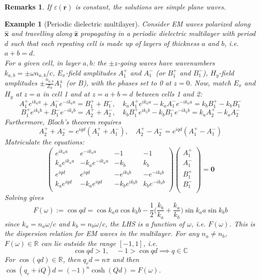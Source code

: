 \documentclass[a4paper]{article}
\newtheorem{remarks}{Remarks}[section]
\newtheorem{eg}{Example}[section]
\theoremstyle{new}
\begin{document}
\begin{remarks}
If $\varepsilon(\mathbf{r})$ is constant, the solutions are simple plane waves.
\end{remarks}
\begin{eg}[Periodic dielectric multilayer]
Consider EM waves polarized along $\mathbf{\hat{x}}$ and travelling along $\mathbf{\hat{z}}$ propagating in a periodic dielectric multilayer with period $d$ such that each repeating cell is made up of layers of thickness $a$ and $b$, i.e. $a+b=d$.\\[5pt]
For a given cell, in layer $a,b$: the $\pm z$-going waves have wavenumbers $k_{a,b}=\pm\omega n_{a,b}/c$, $E_x$-field amplitudes $A_1^+$ and $A_1^-$ (or $B_1^+$ and $B_1^-$), $H_y$-field amplitudes $\pm\frac{n_{a,b}}{Z_0}A_1^\pm$ (or $B$), with the phases set to 0 at $z=0$. Now, match $E_x$ and $H_y$ at $z=a$ in cell 1 and at $z=a+b=d$ between cells 1 and 2:
$$A_1^+e^{ik_aa}+A_1^-e^{-ik_aa}=B_1^++B_1^-,\quad k_aA_1^+e^{ik_aa}-k_aA_1^-e^{-ik_aa}=k_bB_1^+-k_bB_1^-$$
$$B_1^+e^{ik_bb}+B_1^-e^{-ik_bb}=A_2^++A_2^-,\quad k_bB_1^+e^{ik_bb}-k_bB_1^-e^{-ik_bb}=k_aA_2^+-k_aA_2^-$$
Furthermore, Bloch's theorem requires 
$$A_2^++A_2^-=e^{iqd}(A_1^++A_1^-),\quad A_2^+-A_2^-=e^{iqd}(A_1^+-A_1^-)$$
Matriculate the equations:
$$\begin{pmatrix}e^{ik_aa}&e^{-ik_aa}&-1&-1\\k_ae^{ik_aa}&-k_ae^{-ik_aa}&-k_b&k_b\\e^{iqd}&e^{iqd}&-e^{ik_bb}&-e^{-ik_bb}\\k_ae^{iqd}&-k_ae^{iqd}&-k_be^{ik_bb}&k_be^{-ik_bb}\\\end{pmatrix}\begin{pmatrix}A_1^+\\A_1^-\\B_1^+\\B_1^-\\\end{pmatrix}=\boldsymbol{0}$$
Solving gives
$$F(\omega):=\cos qd=\cos k_aa\cos k_bb-\frac{1}{2}\bigg(\frac{k_b}{k_a}+\frac{k_a}{k_b}\bigg)\sin k_aa\sin k_bb$$
since $k_a=n_a\omega/c$ and $k_b=n_b\omega/c$, the LHS is a function of $\omega$, i.e. $F(\omega)$. This is the dispersion relation for EM waves in the multilayer. For any $n_a\neq n_b$, $F(\omega)\in\mathbb{R}$ can lie outside the range $[-1,1]$, i.e.
$$\cos qd>1,\quad -1>\cos qd\implies q\in\mathbb{C}$$
For $\cos(qd)\in\mathbb{R}$, then $q_rd=n\pi$ and then $\cos(q_r+iQ)d=(-1)^n\cosh(Qd)=F(\omega)$.
\begin{center}
\end{center}
\end{eg}
\end{document}
